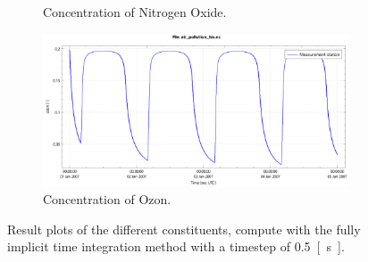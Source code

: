 \documentclass[biblatex]{mooiman_memo}
\begin{document}
\begin{figure}[H]
\begin{subfigure}{0.5\textwidth}
        \caption{Concentration of Nitrogen Oxide.}
    \end{subfigure}
    \begin{subfigure}{0.5\textwidth}
        \includegraphics[width=\textwidth]{figures/ozon_dt0d5.pdf}
        \caption{Concentration of Ozon.}
    \end{subfigure}
    \caption{Result plots of the different constituents, compute with the fully implicit time integration method with a timestep of \SI{0.5}{[\second]}.}
\end{figure}

\end{document}
